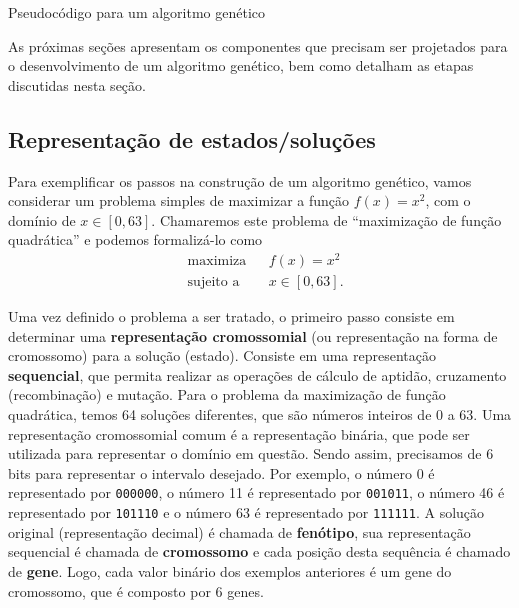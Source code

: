 \begin{algorithm}[h]
	\DontPrintSemicolon
	
	
	\caption{Pseudocódigo para um algoritmo genético}
	\label{alg:algoritmo-genetico}
\end{algorithm}

As próximas seções apresentam os componentes que precisam ser projetados para o desenvolvimento de um algoritmo genético, bem como detalham as etapas discutidas nesta seção.

\subsection{Representação de estados/soluções}

Para exemplificar os passos na construção de um algoritmo genético, vamos considerar um problema simples de maximizar a função $f(x) = x^2$, com o domínio de $x \in [0, 63]$. Chamaremos este problema de ``maximização de função quadrática'' e podemos formalizá-lo como
$$
\begin{aligned}
	& \text{maximiza} & & f(x) = x^2 \\
	& \text{sujeito a} & & x \in [0, 63].
\end{aligned}
$$

Uma vez definido o problema a ser tratado, o primeiro passo consiste em determinar uma \textbf{representação cromossomial} (ou representação na forma de cromossomo) para a solução (estado). Consiste em uma representação \textbf{sequencial}, que permita realizar as operações de cálculo de aptidão, cruzamento (recombinação) e mutação. Para o problema da maximização de função quadrática, temos 64 soluções diferentes, que são números inteiros de 0 a 63. Uma representação cromossomial comum é a representação binária, que pode ser utilizada para representar o domínio em questão. Sendo assim, precisamos de 6 bits para representar o intervalo desejado. Por exemplo, o número 0 é representado por \texttt{000000}, o número 11 é representado por \texttt{001011}, o número 46 é representado por \texttt{101110} e o número 63 é representado por \texttt{111111}. A solução original (representação decimal) é chamada de \textbf{fenótipo}, sua representação sequencial é chamada de \textbf{cromossomo} e cada posição desta sequência é chamado de \textbf{gene}. Logo, cada valor binário dos exemplos anteriores é um gene do cromossomo, que é composto por 6 genes.

